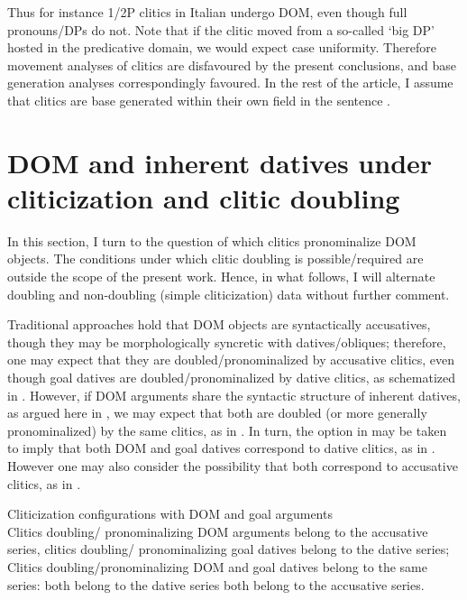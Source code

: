 \documentclass[output=paper,colorlinks,citecolor=brown,modfonts,nonflat]{langsci/langscibook}
\begin{document}
Thus for instance 1/2P clitics in Italian undergo DOM, even though full pronouns/DPs do not. Note that if the clitic moved from a so-called ‘big DP’ hosted in the predicative domain, we would expect case uniformity. Therefore movement analyses of clitics are disfavoured by the present conclusions, and base generation analyses correspondingly favoured. In the rest of the article, I assume that clitics are base generated within their own field in the sentence \citep{Sportiche1996}.

\section{DOM and inherent datives under cliticization and clitic doubling}\label{sec:manzini:3}

In this section, I turn to the question of which clitics pronominalize DOM objects. The conditions under which clitic doubling is possible/required are outside the scope of the present work. Hence, in what follows, I will alternate doubling and non-doubling (simple cliticization) data without further comment.

Traditional approaches hold that DOM objects are syntactically accusatives, though they may be morphologically syncretic with datives/obliques; therefore, one may expect that they are doubled/pronominalized by accusative clitics, even though goal datives are doubled/pronominalized by dative clitics, as schematized in . However, if DOM arguments share the syntactic structure of inherent datives, as argued here in , we may expect that both are doubled (or more generally pronominalized) by the same clitics, as in . In turn, the option in  may be taken to imply that both DOM and goal datives correspond to dative clitics, as in . However one may also consider the possibility that both correspond to accusative clitics, as in .

\ea%
    \label{ex:manzini:20}
    Cliticization configurations with DOM and goal arguments\\
    \ea\label{ex:manzini:20a}
    Clitics doubling/ pronominalizing DOM arguments belong to the accusative series, clitics doubling/ pronominalizing goal datives belong to the dative series;
    \ex\label{ex:manzini:20b}
    Clitics doubling/pronominalizing DOM and goal datives belong to the same series:
        \ea\label{ex:manzini:20bi}
        both belong to the dative series
        \ex\label{ex:manzini:20bii}
        both belong to the accusative series.
        \z
    \z
\z
\end{document}
